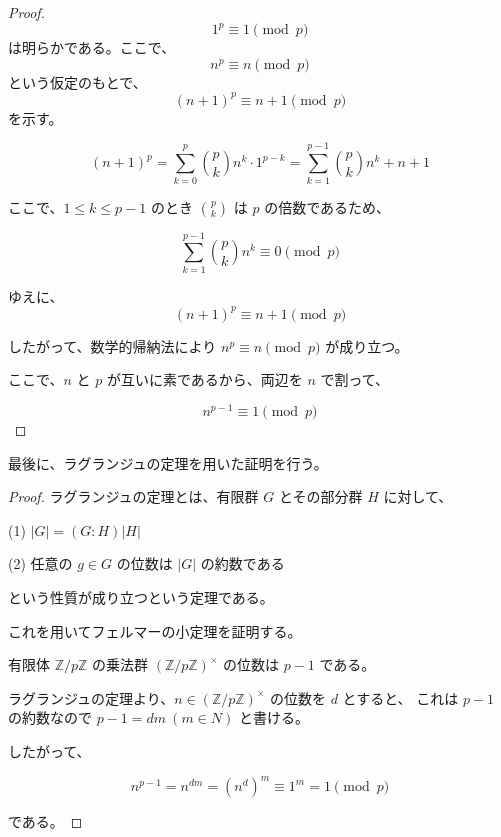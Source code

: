 \begin{proof}

\[
1^p \equiv 1 \pmod{p}
\]
は明らかである。ここで、
\[
n^p \equiv n \pmod{p}
\]
という仮定のもとで、
\[
(n+1)^p \equiv n+1 \pmod{p}
\]
を示す。

\[
(n+1)^p = \sum_{k=0}^p \binom{p}{k} n^k \cdot 1^{p-k} = \sum_{k=1}^{p-1} \binom{p}{k} n^k + n + 1
\]

ここで、$1 \leq k \leq p-1$ のとき $\binom{p}{k}$ は $p$ の倍数であるため、

\[
\sum_{k=1}^{p-1} \binom{p}{k} n^k \equiv 0 \pmod{p}
\]

ゆえに、
\[
(n+1)^p \equiv n + 1 \pmod{p}
\]

したがって、数学的帰納法により $n^p \equiv n \pmod{p}$ が成り立つ。

ここで、$n$ と $p$ が互いに素であるから、両辺を $n$ で割って、

\[
n^{p-1} \equiv 1 \pmod{p}
\]

\end{proof}
\begin{theorem}
最後に、ラグランジュの定理を用いた証明を行う。
\end{theorem}
\begin{proof}

ラグランジュの定理とは、有限群 $G$ とその部分群 $H$ に対して、

(1) $|G| = (G : H)|H|$

(2) 任意の $g \in G$ の位数は $|G|$ の約数である

という性質が成り立つという定理である。

これを用いてフェルマーの小定理を証明する。

有限体 $\mathbb{Z}/p\mathbb{Z}$ の乗法群 $(\mathbb{Z}/p\mathbb{Z})^{\times}$ の位数は $p - 1$ である。

ラグランジュの定理より、$n \in (\mathbb{Z}/p\mathbb{Z})^{\times}$ の位数を $d$ とすると、
これは $p - 1$ の約数なので $p - 1 = dm\ (m \in {N})$ と書ける。

したがって、

\[
n^{p-1} = n^{dm} = (n^d)^m \equiv 1^m = 1 \pmod{p}
\]

である。
\end{proof}
